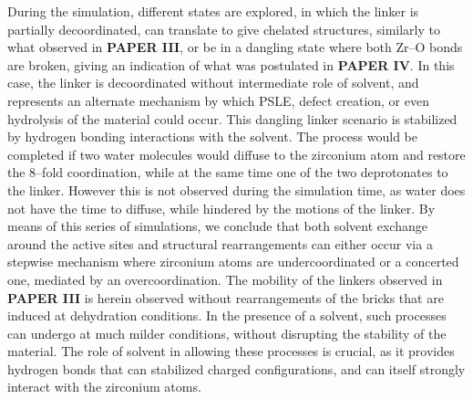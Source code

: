 During the simulation, different states are explored, in which the linker is partially decoordinated, can translate to give chelated structures, similarly to what observed in \textbf{PAPER III}, or be in a dangling state where both Zr--O bonds are broken, giving an indication of what was postulated in \textbf{PAPER IV}. In this case, the linker is decoordinated without intermediate role of solvent, and represents an alternate mechanism by which PSLE, defect creation, or even hydrolysis of the material could occur. This dangling linker scenario is stabilized by hydrogen bonding interactions with the solvent. The process would be completed if two water molecules would diffuse to the zirconium atom and restore the 8--fold coordination, while at the same time one of the two deprotonates to the linker. However this is not observed during the simulation time, as water does not have the time to diffuse, while hindered by the motions of the linker.
\npar
By means of this series of simulations, we conclude that both solvent exchange around the active sites and structural rearrangements can either occur via a stepwise mechanism where zirconium atoms are undercoordinated or a concerted one, mediated by an overcoordination. The mobility of the linkers observed in \textbf{PAPER III} is herein observed without rearrangements of the bricks that are induced at dehydration conditions. In the presence of a solvent, such processes can undergo at much milder conditions, without disrupting the stability of the material. The role of solvent in allowing these processes is crucial, as it provides hydrogen bonds that can stabilized charged configurations, and can itself strongly interact with the zirconium atoms.

\clearpage{\pagestyle{empty}\cleardoublepage}